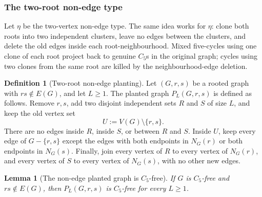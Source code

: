 \documentclass[11pt]{article}
\newtheorem{lemma}[lemma]{Lemma}
\theoremstyle{definition}
\newtheorem{definition}[definition]{Definition}
\begin{document}
\subsubsection{The two-root non-edge type}

Let $\eta$ be the two-vertex non-edge type.  The same idea works for $\eta$:
clone both roots into two independent clusters, leave no edges between the
clusters, and delete the old edges inside each root-neighbourhood.  Mixed
five-cycles using one clone of each root project back to genuine $C_5$s in the
original graph; cycles using two clones from the same root are killed by the
neighbourhood-edge deletion.

\begin{definition}[Two-root non-edge planting]\label{def:c5-nonedge-planting}
Let $(G,r,s)$ be a rooted graph with $rs\notin E(G)$, and let $L\ge1$.  The
planted graph $P_L(G,r,s)$ is defined as follows.  Remove $r,s$, add two
disjoint independent sets $R$ and $S$ of size $L$, and keep the old vertex set
\[
  U:=V(G)\setminus\{r,s\}.
\]
There are no edges inside $R$, inside $S$, or between $R$ and $S$.  Inside
$U$, keep every edge of $G-\{r,s\}$ except the edges with both endpoints in
$N_G(r)$ or both endpoints in $N_G(s)$.  Finally, join every vertex of $R$ to
every vertex of $N_G(r)$, and every vertex of $S$ to every vertex of $N_G(s)$,
with no other new edges.
\end{definition}

\begin{lemma}[The non-edge planted graph is $C_5$-free]\label{lem:c5-nonedge-planting-free}
If $G$ is $C_5$-free and $rs\notin E(G)$, then $P_L(G,r,s)$ is $C_5$-free for
every $L\ge1$.
\end{lemma}
\end{document}
